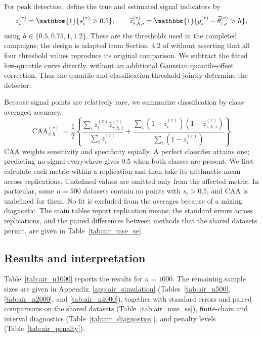 For peak detection, define the true and estimated signal indicators by
\begin{equation}
 z_i^{(r)}=\mathbbm{1}\{s_i^{(r)}>0.5\},\qquad
 \widehat z_{\tau,h,i}^{(r)}=
 \mathbbm{1}\{y_i^{(r)}-\widehat\theta_{\tau,i}^{(r)}>h\},
 \label{eq:air_classification}
\end{equation}
using $h\in\{0.5,0.75,1,1.2\}$. These are the thresholds used in the completed campaigns; the design is adapted from Section~4.2 of \citet{brantley2020baseline} without asserting that all four threshold values reproduce its original comparison. We subtract the fitted low-quantile curve directly, without an additional Gaussian quantile-offset correction. Thus the quantile and classification threshold jointly determine the detector.

Because signal points are relatively rare, we summarize classification by class-averaged accuracy,
\begin{equation}
 \operatorname{CAA}^{(r)}_{\tau,h}=
 \frac{1}{2}\left\{
 \frac{\sum_i z_i^{(r)}\widehat z_{\tau,h,i}^{(r)}}{\sum_i z_i^{(r)}}+
 \frac{\sum_i(1-z_i^{(r)})(1-\widehat z_{\tau,h,i}^{(r)})}
      {\sum_i(1-z_i^{(r)})}\right\}.
 \label{eq:air_caa}
\end{equation}
CAA weights sensitivity and specificity equally. A perfect classifier attains one; predicting no signal everywhere gives $0.5$ when both classes are present. We first calculate each metric within a replication and then take its arithmetic mean across replications. Undefined values are omitted only from the affected metric. In particular, some $n=500$ datasets contain no points with $s_i>0.5$, and CAA is undefined for them. No fit is excluded from the averages because of a mixing diagnostic. The main tables report replication means; the standard errors across replications, and the paired differences between methods that the shared datasets permit, are given in Table~\ref{tab:air_mse_se}.

\subsection{Results and interpretation}
\label{subsec:air_results}

Table~\ref{tab:air_n1000} reports the results for $n=1000$. The remaining sample sizes are given in Appendix~\ref{app:air_simulation} (Tables~\ref{tab:air_n500}, \ref{tab:air_n2000}, and \ref{tab:air_n4000}), together with standard errors and paired comparisons on the shared datasets (Table~\ref{tab:air_mse_se}), finite-chain and interval diagnostics (Table~\ref{tab:air_diagnostics}), and penalty levels (Table~\ref{tab:air_penalty}).


